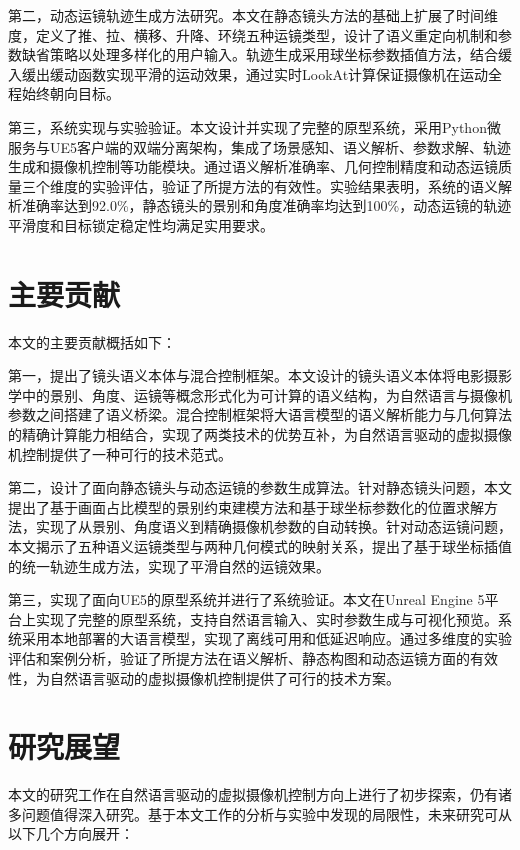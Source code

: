 第二，动态运镜轨迹生成方法研究。本文在静态镜头方法的基础上扩展了时间维度，定义了推、拉、横移、升降、环绕五种运镜类型，设计了语义重定向机制和参数缺省策略以处理多样化的用户输入。轨迹生成采用球坐标参数插值方法，结合缓入缓出缓动函数实现平滑的运动效果，通过实时LookAt计算保证摄像机在运动全程始终朝向目标。

第三，系统实现与实验验证。本文设计并实现了完整的原型系统，采用Python微服务与UE5客户端的双端分离架构，集成了场景感知、语义解析、参数求解、轨迹生成和摄像机控制等功能模块。通过语义解析准确率、几何控制精度和动态运镜质量三个维度的实验评估，验证了所提方法的有效性。实验结果表明，系统的语义解析准确率达到92.0\%，静态镜头的景别和角度准确率均达到100\%，动态运镜的轨迹平滑度和目标锁定稳定性均满足实用要求。

\section{主要贡献}

本文的主要贡献概括如下：

第一，提出了镜头语义本体与混合控制框架。本文设计的镜头语义本体将电影摄影学中的景别、角度、运镜等概念形式化为可计算的语义结构，为自然语言与摄像机参数之间搭建了语义桥梁。混合控制框架将大语言模型的语义解析能力与几何算法的精确计算能力相结合，实现了两类技术的优势互补，为自然语言驱动的虚拟摄像机控制提供了一种可行的技术范式。

第二，设计了面向静态镜头与动态运镜的参数生成算法。针对静态镜头问题，本文提出了基于画面占比模型的景别约束建模方法和基于球坐标参数化的位置求解方法，实现了从景别、角度语义到精确摄像机参数的自动转换。针对动态运镜问题，本文揭示了五种语义运镜类型与两种几何模式的映射关系，提出了基于球坐标插值的统一轨迹生成方法，实现了平滑自然的运镜效果。

第三，实现了面向UE5的原型系统并进行了系统验证。本文在Unreal Engine 5平台上实现了完整的原型系统，支持自然语言输入、实时参数生成与可视化预览。系统采用本地部署的大语言模型，实现了离线可用和低延迟响应。通过多维度的实验评估和案例分析，验证了所提方法在语义解析、静态构图和动态运镜方面的有效性，为自然语言驱动的虚拟摄像机控制提供了可行的技术方案。

\section{研究展望}

本文的研究工作在自然语言驱动的虚拟摄像机控制方向上进行了初步探索，仍有诸多问题值得深入研究。基于本文工作的分析与实验中发现的局限性，未来研究可从以下几个方向展开：

